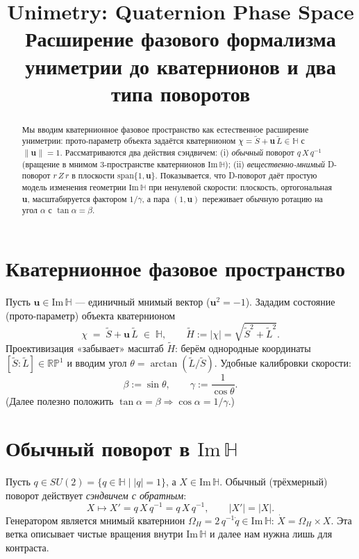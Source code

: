 \documentclass[11pt,a4paper]{article}
\title{\textbf{Unimetry: Quaternion Phase Space}\\
{\large Расширение фазового формализма униметрии до кватернионов и два типа поворотов}}
\author{ }
\date{ }
\newcommand{\HH}{\mathbb{H}}
\newcommand{\ImH}{\mathrm{Im}\,\mathbb{H}}
\newcommand{\uu}{\mathbf{u}}        %
\newcommand{\Sand}[2]{#1\,#2\,#1}   %
\newcommand{\Snd}[2]{#1\,#2\,#1^{-1}} %
\begin{document}
\maketitle

\begin{abstract}
Мы вводим кватернионное фазовое пространство как естественное расширение униметрии: прото-параметр объекта задаётся кватернионом
\(\chi=\tilde S+\uu\,\tilde L\in\HH\) с \(\|\uu\|=1\).
Рассматриваются два действия сэндвичем: (i) \emph{обычный} поворот \(\Snd{q}{X}\) (вращение в мнимом 3-пространстве кватернионов \(\ImH\)); (ii) \emph{вещественно-мнимый} D-поворот \(\Sand{r}{Z}\) в плоскости \(\mathrm{span}\{1,\uu\}\).
Показывается, что D-поворот даёт простую модель изменения геометрии \(\ImH\) при ненулевой скорости: плоскость, ортогональная \(\uu\), масштабируется фактором \(1/\gamma\), а пара \((1,\uu)\) переживает обычную ротацию на угол \(\alpha\) с \(\tan\alpha=\beta\).
\end{abstract}

\section{Кватернионное фазовое пространство}
Пусть \(\uu\in\ImH\) --- единичный мнимый вектор (\(\uu^2=-1\)).
Зададим состояние (прото-параметр) объекта кватернионом
\begin{equation}
  \chi \;=\; \tilde S + \uu\,\tilde L \;\in\; \HH,\qquad
  \tilde H := |\chi| = \sqrt{\tilde S^2+\tilde L^2}.
\end{equation}
Проективизация «забывает» масштаб \(\tilde H\): берём однородные координаты \([\tilde S:\tilde L]\in\mathbb{RP}^1\) и вводим угол
\(\theta=\arctan(\tilde L/\tilde S)\).
Удобные калибровки скорости:
\begin{equation}
  \beta := \sin\theta,\qquad
  \gamma := \frac{1}{\cos\theta}.
\end{equation}
(Далее полезно положить \(\tan\alpha=\beta\Rightarrow \cos\alpha=1/\gamma\).)

\section{Обычный поворот в \texorpdfstring{\(\ImH\)}{Im H}}
Пусть \(q\in SU(2)=\{q\in\HH\mid |q|=1\}\), а \(X\in\ImH\).
Обычный (трёхмерный) поворот действует \emph{сэндвичем с обратным}:
\begin{equation}
  X \mapsto X' = \Snd{q}{X} = q\,X\,q^{-1},\qquad |X'|=|X|.
\end{equation}
Генератором является мнимый кватернион \(\Omega_H=2\,q^{-1}\dot q\in\ImH\):
\(\dot X = \Omega_H\times X\).
Эта ветка описывает чистые вращения внутри \(\ImH\) и далее нам нужна лишь для контраста.
\end{document}
